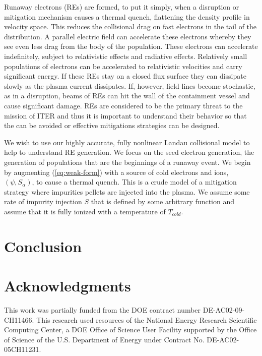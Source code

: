 \documentclass[12pt]{siamart}
\begin{document}
Runaway electrons (REs) are formed, to put it simply, when a disruption or mitigation mechanism causes a thermal quench, flattening the density profile in velocity space.
This reduces the collisional drag on fast electrons in the tail of the distribution.
A parallel electric field can accelerate these electrons whereby they see even less drag from the body of the population.
These electrons can accelerate indefinitely, subject to relativistic effects and radiative effects.
Relatively small populations of electrons can be accelerated to relativistic velocities and carry significant energy.
If these REs stay on a closed flux surface they can dissipate slowly as the plasma current dissipates.
If, however, field lines become stochastic, as in a disruption, beams of REs can hit the wall of the containment vessel and cause significant damage.
REs are considered to be the primary threat to the mission of ITER and thus it is important to understand their behavior so that the can be avoided or effective mitigations strategies can be designed.

We wish to use our highly accurate, fully nonlinear Landau collisional model to help to understand RE generation.
We focus on the seed electron generation, the generation of populations that are the beginnings of a runaway event.
We begin by augmenting (\ref{eq:weak-form}) with a source of cold electrons and ions, $\left(\psi,S_{\alpha}\right)$, to cause a thermal quench.
This is a crude model of a mitigation strategy where impurities pellets are injected into the plasma.
We assume some rate of impurity injection $S$ that is defined by some arbitrary function and assume that it is fully ionized with a temperature of $T_{cold}$.





\section{Conclusion}

\section{Acknowledgments}

 This work was partially funded from the DOE contract number
DE-AC02-09-CH11466.  This research used resources of the National
Energy Research Scientific Computing Center, a DOE Office of Science
User Facility supported by the Office of Science of the
U.S. Department of Energy under Contract No. DE-AC02-05CH11231.



\end{document}
